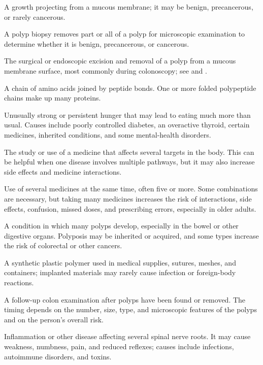  A growth projecting from a mucous membrane; it may be benign, precancerous, or rarely cancerous.

 A polyp biopsy removes part or all of a polyp for microscopic examination to determine whether it is benign, precancerous, or cancerous.

 The surgical or endoscopic excision and removal of a polyp from a mucous membrane surface, most commonly during colonoscopy; see  and .

 A chain of amino acids joined by peptide bonds. One or more folded polypeptide chains make up many proteins.

 Unusually strong or persistent hunger that may lead to eating much more than usual. Causes include poorly controlled diabetes, an overactive thyroid, certain medicines, inherited conditions, and some mental-health disorders.

 The study or use of a medicine that affects several targets in the body. This can be helpful when one disease involves multiple pathways, but it may also increase side effects and medicine interactions.

 Use of several medicines at the same time, often five or more. Some combinations are necessary, but taking many medicines increases the risk of interactions, side effects, confusion, missed doses, and prescribing errors, especially in older adults.

 A condition in which many polyps develop, especially in the bowel or other digestive organs. Polyposis may be inherited or acquired, and some types increase the risk of colorectal or other cancers.

 A synthetic plastic polymer used in medical supplies, sutures, meshes, and containers; implanted materials may rarely cause infection or foreign-body reactions.

 A follow-up colon examination after polyps have been found or removed. The timing depends on the number, size, type, and microscopic features of the polyps and on the person’s overall risk.

 Inflammation or other disease affecting several spinal nerve roots. It may cause weakness, numbness, pain, and reduced reflexes; causes include infections, autoimmune disorders, and toxins.

